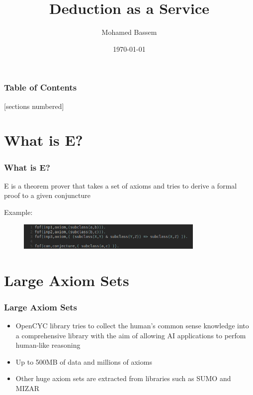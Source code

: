 \documentclass[10pt]{beamer}
\title{Deduction as a Service}
\subtitle{}
\date{\today}
\author{Mohamed Bassem}
\institute{German University in Cairo}
\begin{document}
\maketitle

\begin{frame}
  \frametitle{Table of Contents}
  [sections numbered]
  \tableofcontents[
    hideallsubsections,
  ]
\end{frame}

\section{What is E?}
\begin{frame}[fragile]
  \frametitle{What is E?}

  E is a theorem prover that takes a set of axioms and tries to derive a formal proof to a given conjuncture

  \pause{}
  Example:
  \begin{figure}
    \includegraphics[width=90mm]{imgs/SampleAxioms.png}
  \end{figure}
\end{frame}


\section{Large Axiom Sets}
\begin{frame}[fragile]
  \frametitle{Large Axiom Sets}
  \begin{itemize}[<+- | alert@+>]
    \item OpenCYC library tries to collect the human's common sense knowledge into a comprehensive library with the aim of allowing AI applications to perfom human-like reasoning\cite{wiki:OpenCYC}
      \item Up to 500MB of data and millions of axioms
      \item Other huge axiom sets are extracted from libraries such as SUMO and MIZAR
  \end{itemize}
\end{frame}
\end{document}
